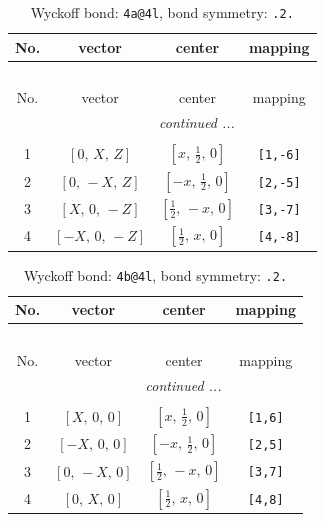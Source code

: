 \documentclass[fleqn,8pt]{jsarticle}
\begin{document}
\begin{longtable}{cccc}
\caption{Wyckoff bond: {\tt 4a@4l}, bond symmetry: {\tt .2.}}
 \\
 \hline \hline
No. & vector & center & mapping \\ \hline \endfirsthead

\multicolumn{3}{l}{\tablename\ \thetable{}} \\
 \hline \hline
No. & vector & center & mapping \\ \hline \endhead

 \hline \hline
\multicolumn{3}{r}{\footnotesize\it continued ...} \\ \endfoot

 \hline \hline
\multicolumn{3}{r}{} \\ \endlastfoot

1 & $\left[ 0,\, X,\, Z \right]$ & $\left[ x,\, \frac{1}{2},\, 0 \right]$ & {\tt [1,-6]} \\ \hline
2 & $\left[ 0,\, - X,\, Z \right]$ & $\left[ - x,\, \frac{1}{2},\, 0 \right]$ & {\tt [2,-5]} \\ \hline
3 & $\left[ X,\, 0,\, - Z \right]$ & $\left[ \frac{1}{2},\, - x,\, 0 \right]$ & {\tt [3,-7]} \\ \hline
4 & $\left[ - X,\, 0,\, - Z \right]$ & $\left[ \frac{1}{2},\, x,\, 0 \right]$ & {\tt [4,-8]} \\
\end{longtable}
\renewcommand{\arraystretch}{1.2}
\begin{longtable}{cccc}
\caption{Wyckoff bond: {\tt 4b@4l}, bond symmetry: {\tt .2.}}
 \\
 \hline \hline
No. & vector & center & mapping \\ \hline \endfirsthead

\multicolumn{3}{l}{\tablename\ \thetable{}} \\
 \hline \hline
No. & vector & center & mapping \\ \hline \endhead

 \hline \hline
\multicolumn{3}{r}{\footnotesize\it continued ...} \\ \endfoot

 \hline \hline
\multicolumn{3}{r}{} \\ \endlastfoot

1 & $\left[ X,\, 0,\, 0 \right]$ & $\left[ x,\, \frac{1}{2},\, 0 \right]$ & {\tt [1,6]} \\ \hline
2 & $\left[ - X,\, 0,\, 0 \right]$ & $\left[ - x,\, \frac{1}{2},\, 0 \right]$ & {\tt [2,5]} \\ \hline
3 & $\left[ 0,\, - X,\, 0 \right]$ & $\left[ \frac{1}{2},\, - x,\, 0 \right]$ & {\tt [3,7]} \\ \hline
4 & $\left[ 0,\, X,\, 0 \right]$ & $\left[ \frac{1}{2},\, x,\, 0 \right]$ & {\tt [4,8]} \\
\end{longtable}
\end{document}
